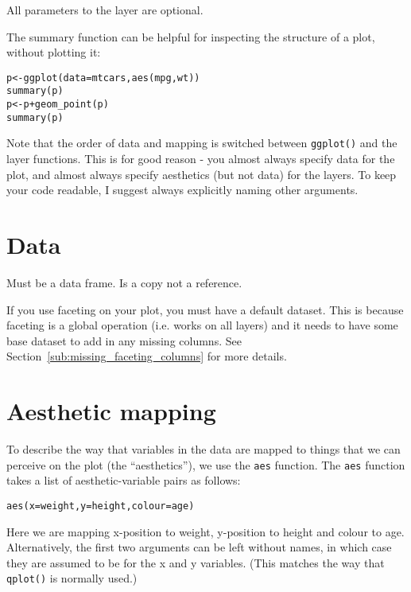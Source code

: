 All parameters to the layer are optional.

The summary function can be helpful for inspecting the structure of a plot, without plotting it:



\begin{alltt}
p <- ggplot(data=mtcars, aes(mpg, wt))
summary(p)
p <- p + geom_point(p)
summary(p)
\end{alltt}

Note that the order of data and mapping is switched between {\tt ggplot()} and the layer functions.  This is for good reason - you almost always specify data for the plot, and almost always specify aesthetics (but not data) for the layers.  To keep your code readable, I suggest always explicitly naming other arguments.

\section{Data}
\label{sec:data}

Must be a data frame.
Is a copy not a reference.

If you use faceting on your plot, you must have a default dataset.  This is because faceting is a global operation (i.e. works on all layers) and it needs to have some base dataset to add in any missing columns.  See Section~\ref{sub:missing_faceting_columns} for more details.

\section{Aesthetic mapping}
\label{sec:aes}

To describe the way that variables in the data are mapped to things that we can perceive on the plot (the ``aesthetics''), we use the {\tt aes} function.  The {\tt aes} function takes a list of aesthetic-variable pairs as follows:

\begin{alltt}
aes(x = weight, y = height, colour = age)
\end{alltt}

Here we are mapping x-position to weight, y-position to height and colour to age.  Alternatively, the first two arguments can be left without names, in which case they are assumed to be for the x and y variables.  (This matches the way that {\tt qplot()} is normally used.)

